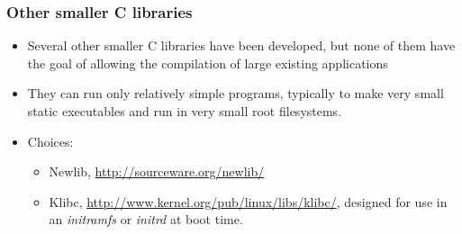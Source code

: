\begin{frame}
  \frametitle{Other smaller C libraries}
  \begin{itemize}
  \item Several other smaller C libraries have been developed, but
    none of them have the goal of allowing the compilation of large
    existing applications
  \item They can run only relatively simple programs,
	typically to make very small static executables and run
	in very small root filesystems.
  \item Choices:
    \begin{itemize}
    \item Newlib, \url{http://sourceware.org/newlib/}
    \item Klibc, \url{http://www.kernel.org/pub/linux/libs/klibc/},
      designed for use in an {\em initramfs} or {\em initrd} at boot
      time.
    \end{itemize}
  \end{itemize}
\end{frame}
